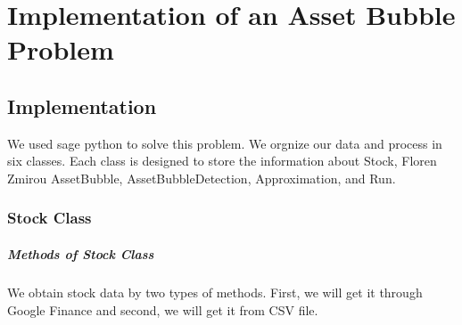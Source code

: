 
\chapter{Implementation of an Asset Bubble Problem}
\section{Implementation}
We used sage python to solve this problem. We orgnize our data and process in six classes. Each class is designed to store the information about Stock, Floren Zmirou
AssetBubble, AssetBubbleDetection, Approximation, and Run.
\subsection{Stock Class}
\paragraph{Methods of Stock Class}
We obtain stock data by two types of methods. First, we will get it through Google Finance and second, we will get it from CSV file.

